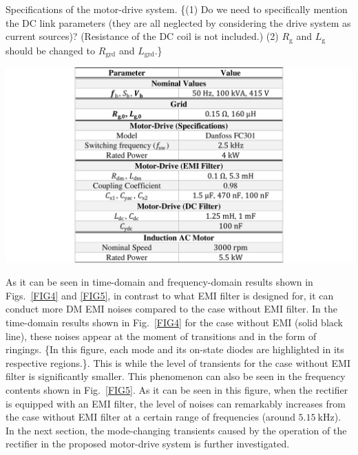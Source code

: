\documentclass[journal,a4paper,10pt,twoside]{IEEEtran} %
\begin{document}
	 \begin{table} [b]
	    \begin{center}
	    \caption{Specifications of the motor-drive system. {\color{red}\{(1) Do we need to specifically mention the DC link parameters (they are all neglected by considering the drive system as current sources)? (Resistance of the DC coil is not included.) (2) $R_\mathrm{g}$ and $L_\mathrm{g}$ should be changed to $R_\mathrm{grd}$ and $L_\mathrm{grd}$.\}}}
	    \vspace{-2mm}
	    \label{TBL1}
	            \includegraphics[clip, trim=65mm 0mm 65mm 0mm, width=1\columnwidth]{FIGS/TBL_1.pdf}
	    \end{center}
	    \vspace{-3mm}
	\end{table}
	
	
	As it can be seen in time-domain and frequency-domain results shown in Figs.~\ref{FIG4} and \ref{FIG5}, in contrast to what EMI filter is designed for, it can conduct more DM EMI noises compared to the case without EMI filter. In the time-domain results shown in Fig.~\ref{FIG4} for the case without EMI (solid black line), these noises appear at the moment of transitions and in the form of ringings. {\color{gray}\{In this figure, each mode and its on-state diodes are highlighted in its respective regions.\}}. This is while the level of transients for the case without EMI filter is significantly smaller. This phenomenon can also be seen in the frequency contents shown in Fig.~\ref{FIG5}. As it can be seen in this figure, when the rectifier is equipped with an EMI filter, the level of noises can remarkably increases from the case without EMI filter at a certain range of frequencies (around $5.15~\mathrm{kHz}$). In the next section, the mode-changing transients caused by the operation of the rectifier in the proposed motor-drive system is further investigated.
	
\end{document}
